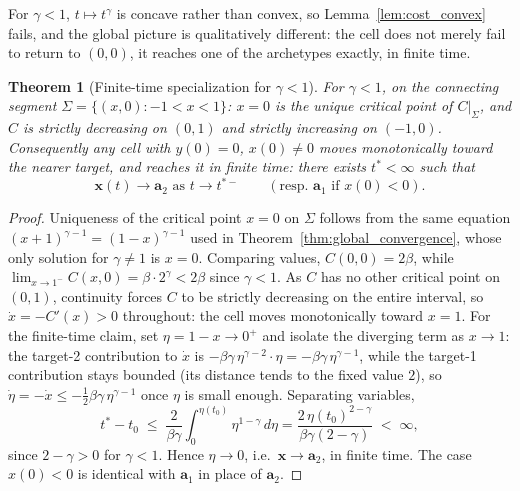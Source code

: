 \documentclass[11pt,a4paper]{article}
\theoremstyle{plain}
\newtheorem{theorem}{Theorem}[section]
\theoremstyle{definition}
\theoremstyle{remark}
\newcommand{\bx}{\bm{x}}
\newcommand{\ba}{\bm{a}}
\newcommand{\bw}{\beta}
\begin{document}
For $\gamma<1$, $t\mapsto t^\gamma$ is concave rather than convex, so
Lemma~\ref{lem:cost_convex} fails, and the global picture is qualitatively
different: the cell does not merely fail to return to $(0,0)$, it reaches
one of the archetypes exactly, in finite time.

\begin{theorem}[Finite-time specialization for $\gamma<1$]
\label{thm:finite_time}
For $\gamma<1$, on the connecting segment $\Sigma=\{(x,0):-1<x<1\}$: $x=0$
is the unique critical point of $C|_{\Sigma}$, and $C$ is strictly
decreasing on $(0,1)$ and strictly increasing on $(-1,0)$. Consequently any
cell with $y(0)=0$, $x(0)\ne0$ moves monotonically toward the nearer
target, and reaches it in \emph{finite time}: there exists $t^*<\infty$
such that
\begin{equation}
  \boxed{
  \bx(t)\longrightarrow\ba_2 \text{ as } t\to t^{*-} \qquad(\text{resp.\ }\ba_1\text{ if }x(0)<0).
  }
  \label{eq:finite_time_result}
\end{equation}
\end{theorem}
\begin{proof}
Uniqueness of the critical point $x=0$ on $\Sigma$ follows from the same
equation $(x+1)^{\gamma-1}=(1-x)^{\gamma-1}$ used in
Theorem~\ref{thm:global_convergence}, whose only solution for $\gamma\ne1$
is $x=0$. Comparing values, $C(0,0)=2\bw$, while
$\lim_{x\to1^-}C(x,0)=\bw\cdot2^{\gamma}<2\bw$ since $\gamma<1$. As $C$ has
no other critical point on $(0,1)$, continuity forces $C$ to be strictly
decreasing on the entire interval, so $\dot x=-C'(x)>0$ throughout: the
cell moves monotonically toward $x=1$. For the finite-time claim, set
$\eta=1-x\to0^+$ and isolate the diverging term as $x\to1$: the target-2
contribution to $\dot x$ is $-\bw\gamma\,\eta^{\gamma-2}\cdot\eta=-\bw\gamma\,\eta^{\gamma-1}$,
while the target-1 contribution stays bounded (its distance tends to the
fixed value $2$), so $\dot\eta=-\dot x\le-\tfrac12\bw\gamma\,\eta^{\gamma-1}$
once $\eta$ is small enough. Separating variables,
\[
  t^*-t_0\;\le\;\frac{2}{\bw\gamma}\int_0^{\eta(t_0)}\eta^{1-\gamma}\,d\eta
  =\frac{2\,\eta(t_0)^{2-\gamma}}{\bw\gamma(2-\gamma)}\;<\;\infty,
\]
since $2-\gamma>0$ for $\gamma<1$. Hence $\eta\to0$, i.e.\ $\bx\to\ba_2$, in
finite time. The case $x(0)<0$ is identical with $\ba_1$ in place of $\ba_2$.
\end{proof}
\end{document}
